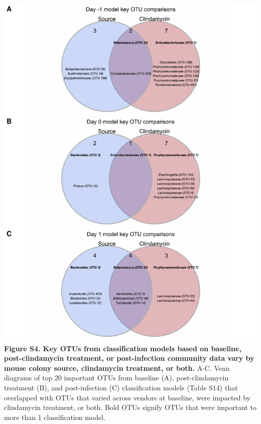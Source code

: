 \documentclass[11pt,]{article}
\begin{document}
\includegraphics{figure_S4.pdf} \textbf{Figure S4. Key OTUs from
classification models based on baseline, post-clindamycin treatment, or
post-infection community data vary by mouse colony source, clindamycin
treatment, or both.} A-C. Venn diagrams of top 20 important OTUs from
baseline (A), post-clindamycin treatment (B), and post-infection (C)
classification models (Table S14) that overlapped with OTUs that varied
across vendors at baseline, were impacted by clindamycin treatment, or
both. Bold OTUs signify OTUs that were important to more than 1
classification model.

\newpage
\end{document}

